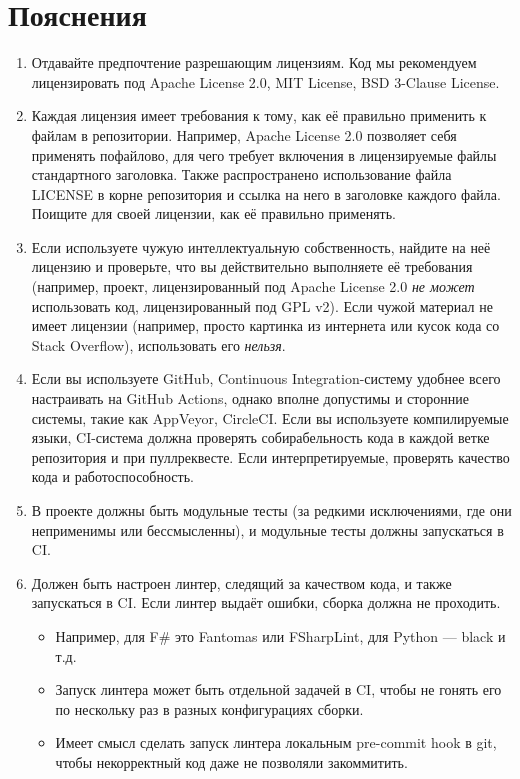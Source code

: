\documentclass[a5paper]{article}
\begin{document}
\section*{Пояснения}

\begin{enumerate}
    \item Отдавайте предпочтение разрешающим лицензиям. Код мы рекомендуем лицензировать под Apache License 2.0, MIT License, BSD 3-Clause License.
    \item Каждая лицензия имеет требования к тому, как её правильно применить к файлам в репозитории. Например, Apache License 2.0 позволяет себя применять пофайлово, для чего требует включения в лицензируемые файлы стандартного заголовка. Также распространено использование файла LICENSE в корне репозитория и ссылка на него в заголовке каждого файла. Поищите для своей лицензии, как её правильно применять.
    \item Если используете чужую интеллектуальную собственность, найдите на неё лицензию и проверьте, что вы действительно выполняете её требования (например, проект, лицензированный под Apache License 2.0 \emph{не может} использовать код, лицензированный под GPL v2). Если чужой материал не имеет лицензии (например, просто картинка из интернета или кусок кода со Stack Overflow), использовать его \emph{нельзя}.
    \item Если вы используете GitHub, Continuous Integration-систему удобнее всего настраивать на GitHub Actions, однако вполне допустимы и сторонние системы, такие как AppVeyor, CircleCI. Если вы используете компилируемые языки, CI-система должна проверять собирабельность кода в каждой ветке репозитория и при пуллреквесте. Если интерпретируемые, проверять качество кода и работоспособность.
    \item В проекте должны быть модульные тесты (за редкими исключениями, где они неприменимы или бессмысленны), и модульные тесты должны запускаться в CI.
    \item Должен быть настроен линтер, следящий за качеством кода, и также запускаться в CI. Если линтер выдаёт ошибки, сборка должна не проходить.
    \begin{itemize}
        \item Например, для F\# это Fantomas или FSharpLint, для Python --- black и т.д.
        \item Запуск линтера может быть отдельной задачей в CI, чтобы не гонять его по нескольку раз в разных конфигурациях сборки.
        \item Имеет смысл сделать запуск линтера локальным pre-commit hook в git, чтобы некорректный код даже не позволяли закоммитить.

\end{itemize}
\end{enumerate}
\end{document}
